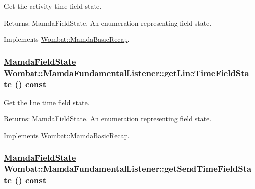Get the activity time field state. 

\begin{Desc}
\item[Returns:]Mamda\-Field\-State. An enumeration representing field state. \end{Desc}


Implements \hyperlink{classWombat_1_1MamdaBasicRecap_04f4a3a041dfc66f733b6c7288b390ac}{Wombat::Mamda\-Basic\-Recap}.\hypertarget{classWombat_1_1MamdaFundamentalListener_b5796fc4bfc42902dbe4c39b3f1640bb}{
\subsubsection[getLineTimeFieldState]{\setlength{\rightskip}{0pt plus 5cm}\hyperlink{namespaceWombat_93aac974f2ab713554fd12a1fa3b7d2a}{Mamda\-Field\-State} Wombat::Mamda\-Fundamental\-Listener::get\-Line\-Time\-Field\-State () const}}
\label{classWombat_1_1MamdaFundamentalListener_b5796fc4bfc42902dbe4c39b3f1640bb}


Get the line time field state. 

\begin{Desc}
\item[Returns:]Mamda\-Field\-State. An enumeration representing field state. \end{Desc}


Implements \hyperlink{classWombat_1_1MamdaBasicRecap_6576c042f1d1db20beb9397873d197c7}{Wombat::Mamda\-Basic\-Recap}.\hypertarget{classWombat_1_1MamdaFundamentalListener_e58cb36ab2dd46fc970fc2ddb3a91aaf}{
\subsubsection[getSendTimeFieldState]{\setlength{\rightskip}{0pt plus 5cm}\hyperlink{namespaceWombat_93aac974f2ab713554fd12a1fa3b7d2a}{Mamda\-Field\-State} Wombat::Mamda\-Fundamental\-Listener::get\-Send\-Time\-Field\-State () const}}
\label{classWombat_1_1MamdaFundamentalListener_e58cb36ab2dd46fc970fc2ddb3a91aaf}


